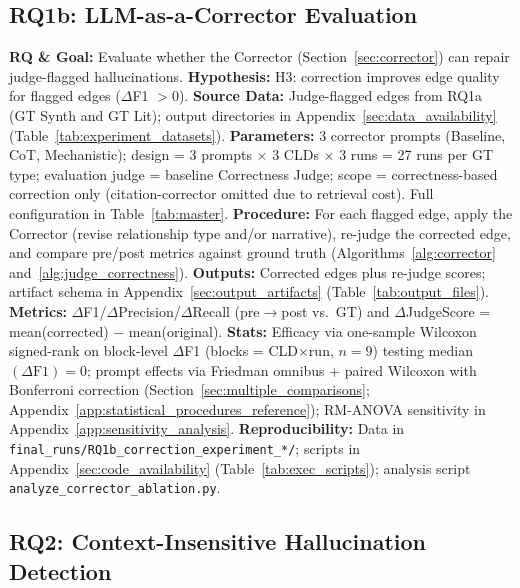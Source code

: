 \subsection{RQ1b: LLM-as-a-Corrector Evaluation}
\label{sec:rq1b}
\label{sec:rq1b_experiments}

\noindent\textbf{RQ \& Goal:} Evaluate whether the Corrector (Section~\ref{sec:corrector}) can repair judge-flagged hallucinations. \textbf{Hypothesis:} H3: correction improves edge quality for flagged edges ($\Delta$F1 $> 0$). \textbf{Source Data:} Judge-flagged edges from RQ1a (GT Synth and GT Lit); output directories in Appendix~\ref{sec:data_availability} (Table~\ref{tab:experiment_datasets}). \textbf{Parameters:} 3 corrector prompts (Baseline, CoT, Mechanistic); design = 3 prompts $\times$ 3 CLDs $\times$ 3 runs = 27 runs per GT type; evaluation judge = baseline Correctness Judge; scope = correctness-based correction only (citation-corrector omitted due to retrieval cost). Full configuration in Table~\ref{tab:master}. \textbf{Procedure:} For each flagged edge, apply the Corrector (revise relationship type and/or narrative), re-judge the corrected edge, and compare pre/post metrics against ground truth (Algorithms~\ref{alg:corrector} and~\ref{alg:judge_correctness}). \textbf{Outputs:} Corrected edges plus re-judge scores; artifact schema in Appendix~\ref{sec:output_artifacts} (Table~\ref{tab:output_files}). \textbf{Metrics:} $\Delta$F1/$\Delta$Precision/$\Delta$Recall (pre$\rightarrow$post vs.\ GT) and $\Delta$JudgeScore = mean(corrected) $-$ mean(original). \textbf{Stats:} Efficacy via one-sample Wilcoxon signed-rank on block-level $\Delta$F1 (blocks = CLD$\times$run, $n{=}9$) testing median$(\Delta\mathrm{F1})=0$; prompt effects via Friedman omnibus + paired Wilcoxon with Bonferroni correction (Section~\ref{sec:multiple_comparisons}; Appendix~\ref{app:statistical_procedures_reference}); RM-ANOVA sensitivity in Appendix~\ref{app:sensitivity_analysis}. \textbf{Reproducibility:} Data in \texttt{final\_runs/RQ1b\_correction\_experiment\_*/}; scripts in Appendix~\ref{sec:code_availability} (Table~\ref{tab:exec_scripts}); analysis script \texttt{analyze\_corrector\_ablation.py}.

\subsection{RQ2: Context-Insensitive Hallucination Detection}
\label{sec:rq2_experiments}

